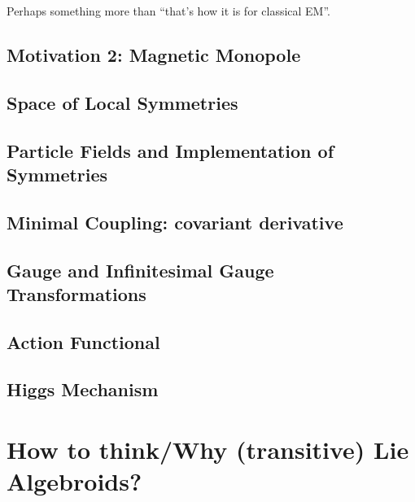  Perhaps something more than ``that's how it is for classical EM''.

\subsection{Motivation 2: Magnetic Monopole}

\subsection{Space of Local Symmetries}

\subsection{Particle Fields and Implementation of Symmetries}

\subsection{Minimal Coupling: covariant derivative}

\subsection{Gauge and Infinitesimal Gauge Transformations}

\subsection{Action Functional}

\subsection{Higgs Mechanism}

\section{How to think/Why (transitive) Lie Algebroids?}

